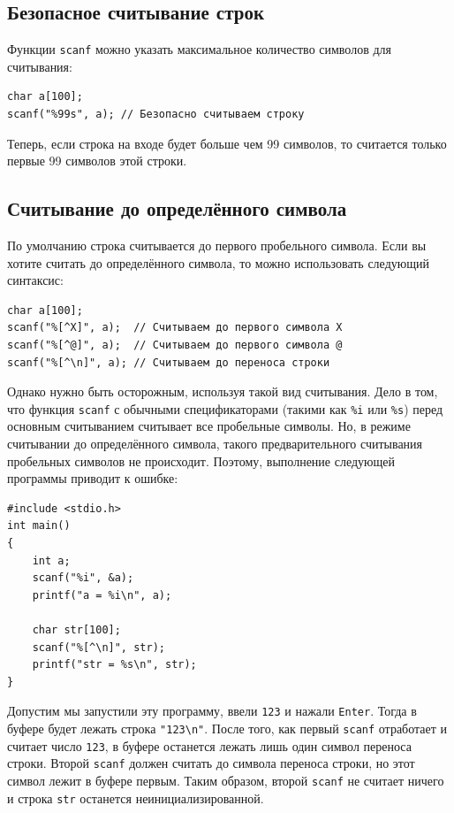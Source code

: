 \documentclass{article}
\begin{document}
\subsection*{Безопасное считывание строк}
Функции \texttt{scanf} можно указать максимальное количество символов для считывания:
\begin{lstlisting}
char a[100];
scanf("%99s", a); // Безопасно считываем строку
\end{lstlisting}
Теперь, если строка на входе будет больше чем 99 символов, то считается только первые 99 символов этой строки.

\subsection*{Считывание до определённого символа}
По умолчанию строка считывается до первого пробельного символа. Если вы хотите считать до определённого символа, то можно использовать следующий синтаксис:
\begin{lstlisting}
char a[100];
scanf("%[^X]", a);  // Считываем до первого символа X
scanf("%[^@]", a);  // Считываем до первого символа @
scanf("%[^\n]", a); // Считываем до переноса строки
\end{lstlisting}

Однако нужно быть осторожным, используя такой вид считывания. 
Дело в том, что функция \texttt{scanf} с обычными спецификаторами (такими как \texttt{\%i} или \texttt{\%s}) перед основным считыванием считывает все пробельные символы. Но, в режиме считывании до определённого символа, такого предварительного считывания пробельных символов не происходит. Поэтому, выполнение следующей программы приводит к ошибке:
\begin{lstlisting}
#include <stdio.h>
int main()
{
    int a;
    scanf("%i", &a);
    printf("a = %i\n", a);

    char str[100];
    scanf("%[^\n]", str);
    printf("str = %s\n", str);
}
\end{lstlisting}

Допустим мы запустили эту программу, ввели \texttt{123} и нажали \texttt{Enter}.
Тогда в буфере будет лежать строка \texttt{"123\textbackslash n"}. После того, как первый \texttt{scanf} отработает и считает число \texttt{123}, в буфере останется лежать лишь один символ переноса строки. Второй \texttt{scanf} должен считать до символа переноса строки, но этот символ лежит в буфере первым. Таким образом, второй \texttt{scanf} не считает ничего и строка \texttt{str} останется неинициализированной.
\end{document}

